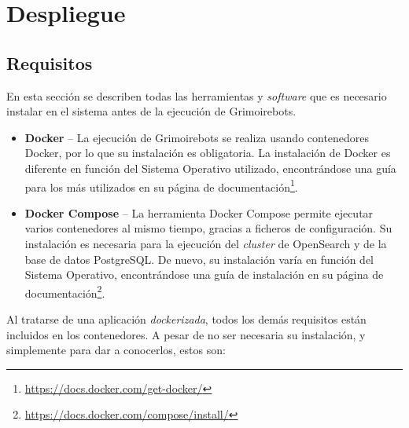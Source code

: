 \section{Despliegue}

\subsection{Requisitos}

En esta sección se describen todas las herramientas y \emph{software} que es necesario instalar en el sistema antes de la ejecución de Grimoirebots.

\begin{itemize}
    \item \textbf{Docker} -- La ejecución de Grimoirebots se realiza usando contenedores Docker, por lo que su instalación es obligatoria. La instalación de Docker es diferente en función del Sistema Operativo utilizado, encontrándose una guía para los más utilizados en su página de documentación\footnote{\url{https://docs.docker.com/get-docker/}}.
    \item \textbf{Docker Compose} -- La herramienta Docker Compose permite ejecutar varios contenedores al mismo tiempo, gracias a ficheros de configuración. Su instalación es necesaria para la ejecución del \emph{cluster} de OpenSearch y de la base de datos PostgreSQL. De nuevo, su instalación varía en función del Sistema Operativo, encontrándose una guía de instalación en su página de documentación\footnote{\url{https://docs.docker.com/compose/install/}}.
\end{itemize}

Al tratarse de una aplicación \emph{dockerizada}, todos los demás requisitos están incluidos en los contenedores. A pesar de no ser necesaria su instalación, y simplemente para dar a conocerlos, estos son:

